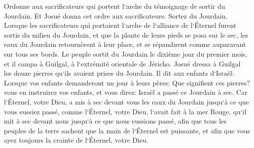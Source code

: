 \verse Ordonne aux sacrificateurs qui portent l`arche du témoignage de sortir du Jourdain. 
\verse Et Josué donna cet ordre aux sacrificateurs: Sortez du Jourdain. 
\verse Lorsque les sacrificateurs qui portaient l`arche de l`alliance de l`Éternel furent sortis du milieu du Jourdain, et que la plante de leurs pieds se posa sur le sec, les eaux du Jourdain retournèrent à leur place, et se répandirent comme auparavant sur tous ses bords. 
\verse Le peuple sortit du Jourdain le dixième jour du premier mois, et il campa à Guilgal, à l`extrémité orientale de Jéricho. 
\verse Josué dressa à Guilgal les douze pierres qu`ils avaient prises du Jourdain. 
\verse Il dit aux enfants d`Israël: Lorsque vos enfants demanderont un jour à leurs pères: Que signifient ces pierres? 
\verse vous en instruirez vos enfants, et vous direz: Israël a passé ce Jourdain à sec. 
\verse Car l`Éternel, votre Dieu, a mis à sec devant vous les eaux du Jourdain jusqu`à ce que vous eussiez passé, comme l`Éternel, votre Dieu, l`avait fait à la mer Rouge, qu`il mit à sec devant nous jusqu`à ce que nous eussions passé, 
\verse afin que tous les peuples de la terre sachent que la main de l`Éternel est puissante, et afin que vous ayez toujours la crainte de l`Éternel, votre Dieu. 

